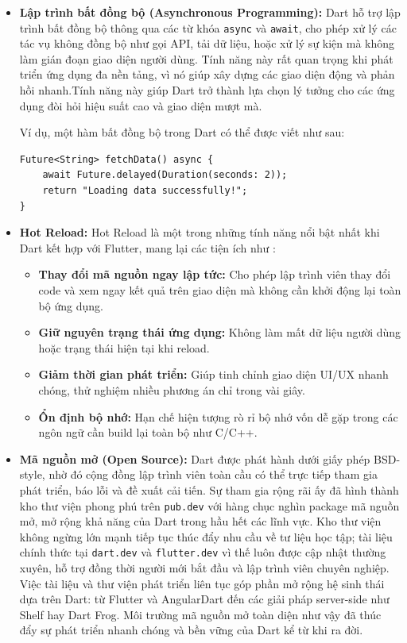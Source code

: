 \documentclass[../DoAn.tex]{subfiles}
\numberwithin{figure}{chapter}
\begin{document}
\begin{itemize}
\item \textbf{Lập trình bất đồng bộ (Asynchronous Programming):} 
Dart hỗ trợ lập trình bất đồng bộ thông qua các từ khóa \texttt{async} và \texttt{await}, cho phép xử lý các tác vụ không đồng bộ như gọi API, tải dữ liệu, hoặc xử lý sự kiện mà không làm gián đoạn giao diện người dùng. Tính năng này rất quan trọng khi phát triển ứng dụng đa nền tảng, vì nó giúp xây dựng các giao diện động và phản hồi nhanh.Tính năng này giúp Dart trở thành lựa chọn lý tưởng cho các ứng dụng đòi hỏi hiệu suất cao và giao diện mượt mà.

Ví dụ, một hàm bất đồng bộ trong Dart có thể được viết như sau:
    
\begin{lstlisting}
Future<String> fetchData() async {
    await Future.delayed(Duration(seconds: 2));
    return "Loading data successfully!";
}
\end{lstlisting}
    


\item \textbf{Hot Reload:} 
Hot Reload là một trong những tính năng nổi bật nhất khi Dart kết hợp với Flutter, mang lại các tiện ích như :

\begin{itemize}
    \item \textbf{Thay đổi mã nguồn ngay lập tức:} Cho phép lập trình viên thay đổi code và xem ngay kết quả trên giao diện mà không cần khởi động lại toàn bộ ứng dụng.
    \item \textbf{Giữ nguyên trạng thái ứng dụng:} Không làm mất dữ liệu người dùng hoặc trạng thái hiện tại khi reload.
    \item \textbf{Giảm thời gian phát triển:} Giúp tinh chỉnh giao diện UI/UX nhanh chóng, thử nghiệm nhiều phương án chỉ trong vài giây.
    \item \textbf{Ổn định bộ nhớ:} Hạn chế hiện tượng rò rỉ bộ nhớ vốn dễ gặp trong các ngôn ngữ cần build lại toàn bộ như C/C++.
\end{itemize}


\item \textbf{Mã nguồn mở (Open Source):} Dart được phát hành dưới giấy phép BSD-style, nhờ đó cộng đồng lập trình viên toàn cầu có thể trực tiếp tham gia phát triển, báo lỗi và đề xuất cải tiến. Sự tham gia rộng rãi ấy đã hình thành kho thư viện phong phú trên \texttt{pub.dev} với hàng chục nghìn package mã nguồn mở, mở rộng khả năng của Dart trong hầu hết các lĩnh vực. Kho thư viện không ngừng lớn mạnh tiếp tục thúc đẩy nhu cầu về tư liệu học tập; tài liệu chính thức tại \texttt{dart.dev} và \texttt{flutter.dev} vì thế luôn được cập nhật thường xuyên, hỗ trợ đồng thời người mới bắt đầu và lập trình viên chuyên nghiệp. Việc tài liệu và thư viện phát triển liên tục góp phần mở rộng hệ sinh thái dựa trên Dart: từ Flutter và AngularDart đến các giải pháp server-side như Shelf hay Dart Frog. Môi trường mã nguồn mở toàn diện như vậy đã thúc đẩy sự phát triển nhanh chóng và bền vững của Dart kể từ khi ra đời.










\end{itemize}
\end{document}
